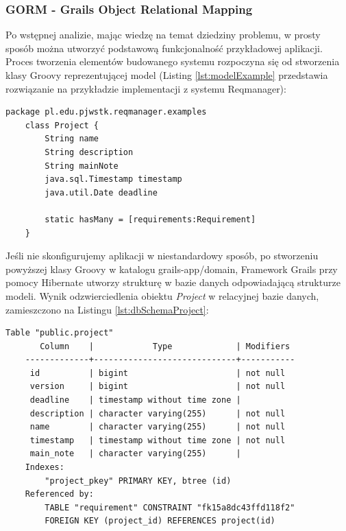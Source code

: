     \subsubsection{GORM - Grails Object Relational Mapping}
  
    Po wstępnej analizie, mając wiedzę na temat dziedziny problemu, w prosty sposób można utworzyć podstawową funkcjonalność przykładowej aplikacji. Proces tworzenia elementów budowanego systemu rozpoczyna się od stworzenia klasy Groovy reprezentującej model (Listing \ref{lst:modelExample} przedstawia rozwiązanie na przykładzie implementacji z systemu Reqmanager):

    \begin{lstlisting}[caption={klasa modelu Project.groovy}, label={lst:modelExample}]
    package pl.edu.pjwstk.reqmanager.examples
    class Project {
        String name
        String description
        String mainNote
        java.sql.Timestamp timestamp
        java.util.Date deadline

        static hasMany = [requirements:Requirement]
    }
    \end{lstlisting}

    Jeśli nie skonfigurujemy aplikacji w niestandardowy sposób, po stworzeniu powyższej klasy Groovy w katalogu grails-app/domain, Framework Grails przy pomocy Hibernate utworzy strukturę w bazie danych odpowiadającą strukturze modeli. Wynik odzwierciedlenia obiektu \emph{Project} w relacyjnej bazie danych, zamieszczono na Listingu \ref{lst:dbSchemaProject}:

    \begin{lstlisting}[caption={struktura bazy danych dla modelu Project}, label={lst:dbSchemaProject}]
                      Table "public.project"
       Column    |            Type             | Modifiers 
    -------------+-----------------------------+-----------
     id          | bigint                      | not null
     version     | bigint                      | not null
     deadline    | timestamp without time zone | 
     description | character varying(255)      | not null
     name        | character varying(255)      | not null
     timestamp   | timestamp without time zone | not null
     main_note   | character varying(255)      | 
    Indexes:
        "project_pkey" PRIMARY KEY, btree (id)
    Referenced by:
        TABLE "requirement" CONSTRAINT "fk15a8dc43ffd118f2" 
        FOREIGN KEY (project_id) REFERENCES project(id)
    \end{lstlisting}

